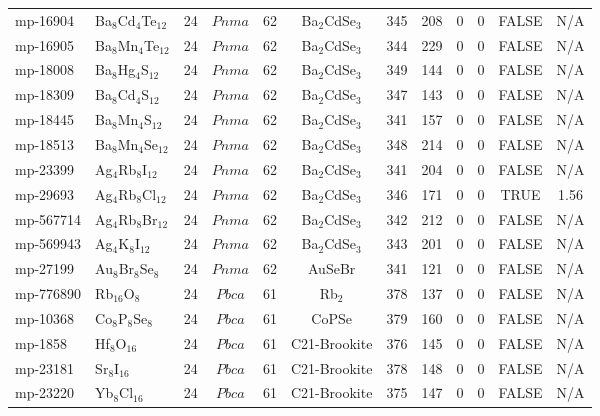 {\begin{longtable}{llcccccccccc}
    mp-16904 & Ba$_{8}$Cd$_{4}$Te$_{12}$ & 24    & $Pnma$ & 62    & Ba$_{2}$CdSe$_{3}$ & 345   & 208   & 0     & 0     & FALSE & N/A \\
    mp-16905 & Ba$_{8}$Mn$_{4}$Te$_{12}$ & 24    & $Pnma$ & 62    & Ba$_{2}$CdSe$_{3}$ & 344   & 229   & 0     & 0     & FALSE & N/A \\
    mp-18008 & Ba$_{8}$Hg$_{4}$S$_{12}$ & 24    & $Pnma$ & 62    & Ba$_{2}$CdSe$_{3}$ & 349   & 144   & 0     & 0     & FALSE & N/A \\
    mp-18309 & Ba$_{8}$Cd$_{4}$S$_{12}$ & 24    & $Pnma$ & 62    & Ba$_{2}$CdSe$_{3}$ & 347   & 143   & 0     & 0     & FALSE & N/A \\
    mp-18445 & Ba$_{8}$Mn$_{4}$S$_{12}$ & 24    & $Pnma$ & 62    & Ba$_{2}$CdSe$_{3}$ & 341   & 157   & 0     & 0     & FALSE & N/A \\
    mp-18513 & Ba$_{8}$Mn$_{4}$Se$_{12}$ & 24    & $Pnma$ & 62    & Ba$_{2}$CdSe$_{3}$ & 348   & 214   & 0     & 0     & FALSE & N/A \\
    mp-23399 & Ag$_{4}$Rb$_{8}$I$_{12}$ & 24    & $Pnma$ & 62    & Ba$_{2}$CdSe$_{3}$ & 341   & 204   & 0     & 0     & FALSE & N/A \\
    mp-29693 & Ag$_{4}$Rb$_{8}$Cl$_{12}$ & 24    & $Pnma$ & 62    & Ba$_{2}$CdSe$_{3}$ & 346   & 171   & 0     & 0     & TRUE  & 1.56  \\
    mp-567714 & Ag$_{4}$Rb$_{8}$Br$_{12}$ & 24    & $Pnma$ & 62    & Ba$_{2}$CdSe$_{3}$ & 342   & 212   & 0     & 0     & FALSE & N/A \\
    mp-569943 & Ag$_{4}$K$_{8}$I$_{12}$ & 24    & $Pnma$ & 62    & Ba$_{2}$CdSe$_{3}$ & 343   & 201   & 0     & 0     & FALSE & N/A \\
    mp-27199 & Au$_{8}$Br$_{8}$Se$_{8}$ & 24    & $Pnma$ & 62    & AuSeBr & 341   & 121   & 0     & 0     & FALSE & N/A \\
    mp-776890 & Rb$_{16}$O$_{8}$ & 24    & $Pbca$ & 61    & Rb$_{2}$ & 378   & 137   & 0     & 0     & FALSE & N/A \\
    mp-10368 & Co$_{8}$P$_{8}$Se$_{8}$ & 24    & $Pbca$ & 61    & CoPSe & 379   & 160   & 0     & 0     & FALSE & N/A \\
    mp-1858 & Hf$_{8}$O$_{16}$ & 24    & $Pbca$ & 61    & C21-Brookite & 376   & 145   & 0     & 0     & FALSE & N/A \\
    mp-23181 & Sr$_{8}$I$_{16}$ & 24    & $Pbca$ & 61    & C21-Brookite & 378   & 148   & 0     & 0     & FALSE & N/A \\
    mp-23220 & Yb$_{8}$Cl$_{16}$ & 24    & $Pbca$ & 61    & C21-Brookite & 375   & 147   & 0     & 0     & FALSE & N/A \\

\end{longtable}}
